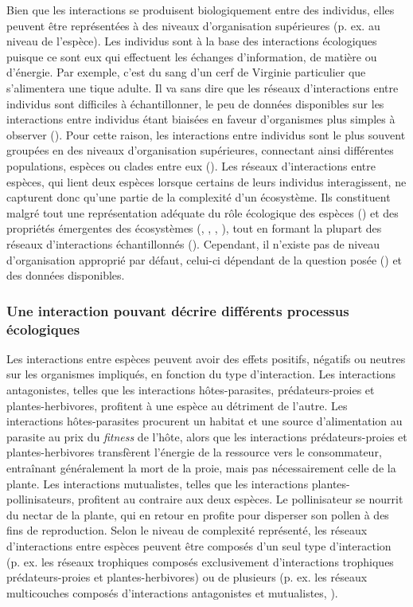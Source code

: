Bien que les interactions se produisent biologiquement entre des individus,
elles peuvent être représentées à des niveaux d'organisation supérieures (p. ex.
au niveau de l'espèce). Les individus sont à la base des interactions
écologiques puisque ce sont eux qui effectuent les échanges d'information, de
matière ou d'énergie. Par exemple, c'est du sang d'un cerf de Virginie
particulier que s'alimentera une tique adulte. Il va sans dire que les réseaux
d'interactions entre individus sont difficiles à échantillonner, le peu de
données disponibles sur les interactions entre individus étant biaisées en
faveur d'organismes plus simples à observer (\cite{Guimaraes2020Structure}).
Pour cette raison, les interactions entre individus sont le plus souvent
groupées en des niveaux d'organisation supérieures, connectant ainsi différentes
populations, espèces ou clades entre eux (\cite{Elton1927Animal}). Les réseaux
d'interactions entre espèces, qui lient deux espèces lorsque certains de leurs
individus interagissent, ne capturent donc qu'une partie de la complexité d'un
écosystème. Ils constituent malgré tout une représentation adéquate du rôle
écologique des espèces (\cite{Delmas2019Analysing}) et des propriétés émergentes
des écosystèmes (\cite{Loreau2010Populations}, \cite{McCann2011Food},
\cite{Bascompte2013Mutualistic}, \cite{Gonzalez2020Scalingup}), tout en formant
la plupart des réseaux d'interactions échantillonnés
(\cite{Guimaraes2020Structure}). Cependant, il n'existe pas de niveau
d'organisation approprié par défaut, celui-ci dépendant de la question posée
(\cite{Niquil2020Shifting}) et des données disponibles.

\subsubsection{Une interaction pouvant décrire différents processus écologiques} 

Les interactions entre espèces peuvent avoir des effets positifs, négatifs ou
neutres sur les organismes impliqués, en fonction du type d'interaction. Les
interactions antagonistes, telles que les interactions hôtes-parasites,
prédateurs-proies et plantes-herbivores, profitent à une espèce au détriment de
l'autre. Les interactions hôtes-parasites procurent un habitat et une source
d'alimentation au parasite au prix du \textit{fitness} de l'hôte, alors que les
interactions prédateurs-proies et plantes-herbivores transfèrent l'énergie de la
ressource vers le consommateur, entraînant généralement la mort de la proie,
mais pas nécessairement celle de la plante. Les interactions mutualistes, telles
que les interactions plantes-pollinisateurs, profitent au contraire aux deux
espèces. Le pollinisateur se nourrit du nectar de la plante, qui en retour en
profite pour disperser son pollen à des fins de reproduction. Selon le niveau de
complexité représenté, les réseaux d'interactions entre espèces peuvent être
composés d'un seul type d'interaction (p. ex. les réseaux trophiques composés
exclusivement d'interactions trophiques prédateurs-proies et plantes-herbivores)
ou de plusieurs (p. ex. les réseaux multicouches composés d'interactions
antagonistes et mutualistes, \cite{Pilosof2017Multilayer}).

